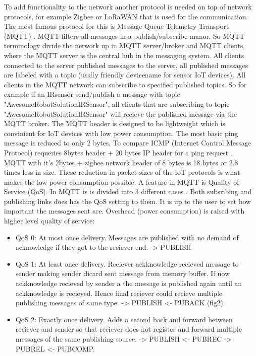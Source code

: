 \documentclass[article,a4paper]{IEEEtran}
\begin{document}
    To add functionality to the network another protocol is needed on top of network protocols, for example Zigbee or LoRaWAN that is used for the communication. The most famous protocol for this is Message Queue Telemetry Transport (MQTT) \cite{mqtt3.1.1,mqtt5.0}. MQTT filters all messages in a publish/subscribe manor. So MQTT terminology divide the network up in MQTT server/broker and MQTT clients, where the MQTT server is the central hub in the messaging system. All clients connected to the server published messages to the server, all published messages are labeled with a topic (usally friendly devicename for sensor IoT devices). All clients in the MQTT network can subscribe to specified published topics. So for example if an IRsensor send/publish a message with topic "AwesomeRobotSolutionIRSensor", all clients that are subscribing to topic "AwesomeRobotSolutionIRSensor" will recieve the published message via the MQTT broker. The MQTT header is designed to be lightweight which is convinient for IoT devices with low power consumption. The most basic ping message is reduced to only 2 bytes. To compare ICMP (Internet Control Message Protocol) requeries 8bytes header + 20 bytes IP header for a ping request \cite{ICMPping}. MQTT with it's 2bytes + zigbee network header of 8 bytes is 18 bytes or 2.8 times less in size. These reduction in packet sizes of the IoT protocols is what makes the low power consumption possible.
    \newline\newline
    A feature in MQTT is Quality of Service (QoS). In MQTT is is divided into 3 different cases \cite{mqtt3.1.1,mqtt5.0}. Both subsribing and publishing links does has the QoS setting to them. It is up to the user to set how important the messages sent are. Overhead (power consumption) is raised with higher level quality of service:
    \begin{itemize}
        \item QoS 0: At most once delivery. Messages are published with no demand of acknowledge if they got to the reciever end. -> PUBLISH
        \item QoS 1: At least once delivery. Reciever ackknowledge recieved message to sender making sender dicard sent message from memory buffer. If now ackknowledge recieved by sender a the message is published again until an ackknowledge is recieved. Hence final reciever could recieve multiple publishing messages of same type. -> PUBLISH <- PUBACK (fig2)
        \item QoS 2: Exactly once delivery. Adds a second back and forward between reciever and sender so that reciever does not register and forward multiple messages of the same publishing source. -> PUBLISH <- PUBREC -> PUBREL <- PUBCOMP.  
    \end{itemize}
\end{document}
